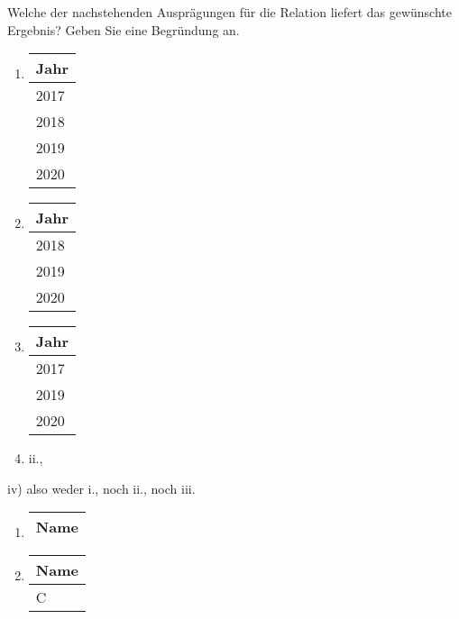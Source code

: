 \documentclass{lehramt-informatik-aufgabe}
\begin{document}
\begin{enumerate}
\begin{enumerate}
Welche der nachstehenden Ausprägungen für die Relation liefert das
gewünschte Ergebnis? Geben Sie eine Begründung an.

\begin{enumerate}
\item

\begin{tabular}{|l|}
\hline
Jahr\\\hline\hline
2017\\\hline
2018\\\hline
2019\\\hline
2020\\\hline
\end{tabular}

\item

\begin{tabular}{|l|}
\hline
Jahr\\\hline\hline
2018\\\hline
2019\\\hline
2020\\\hline
\end{tabular}

\item

\begin{tabular}{|l|}
\hline
Jahr\\\hline\hline
2017\\\hline
2019\\\hline
2020\\\hline
\end{tabular}

\item ii.,

\end{enumerate}

%

\begin{liAntwort}
iv) also weder i., noch ii., noch iii.

\begin{enumerate}
\item

\begin{tabular}{|l|}
\hline
Name \\\hline\hline
\end{tabular}

\item

\begin{tabular}{|l|}
\hline
Name \\\hline\hline
C \\\hline
\end{tabular}


\end{enumerate}
\end{liAntwort}
\end{enumerate}
\end{enumerate}
\end{document}
